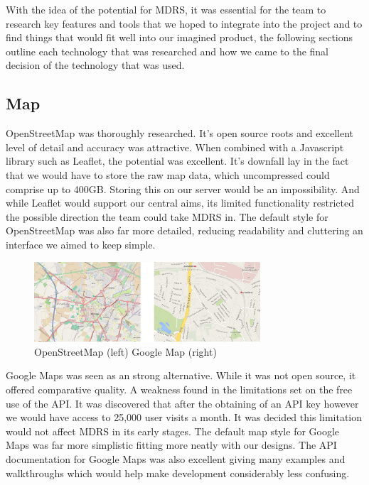 \documentclass{l3proj}
\begin{document}
With the idea of the potential for MDRS, it was essential for the team to research key features and tools that we hoped to integrate into the project and to find things that would fit well into our imagined product, the following sections outline each technology that was researched and how we came to the final decision of the technology that was used. 

\subsection{Map}
OpenStreetMap was thoroughly researched. It's open source roots and excellent level of detail and accuracy was attractive. When combined with a Javascript library such as Leaflet, the potential was excellent. It’s downfall lay in the fact that we would have to store the raw map data, which uncompressed could comprise up to 400GB. Storing this on our server would be an impossibility. And while Leaflet would support our central aims, its limited functionality restricted the possible direction the team could take MDRS in. The default style for OpenStreetMap was also far more detailed, reducing readability and cluttering an interface we aimed to keep simple.

\begin{figure}[ht!]
  \centering
\includegraphics[width=0.75\textwidth]{images/openstreetmap_google-map.jpg}
\caption{OpenStreetMap (left) Google Map (right)}
\end{figure}

Google Maps was seen as an strong alternative. While it was not open source, it offered comparative quality. A weakness found in the limitations set on the free use of the API. It was discovered that after the obtaining of an API key however we would have access to 25,000 user visits a month. It was decided this limitation would not affect MDRS in its early stages. The default map style for Google Maps was far more simplistic  fitting more neatly with our designs. The API documentation for Google Maps was also excellent giving many examples and walkthroughs which would help make development considerably less confusing.
\end{document}
